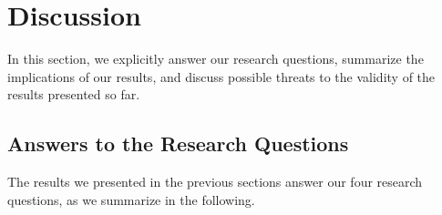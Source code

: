 \section{Discussion}\label{sec:discussion}

In this section, we explicitly answer our research questions,
summarize the implications of our results, and discuss possible
threats to the validity of the results presented so far.

\subsection{Answers to the Research Questions}

The results we presented in the previous sections
 answer our four research questions, as
we summarize in the following.

